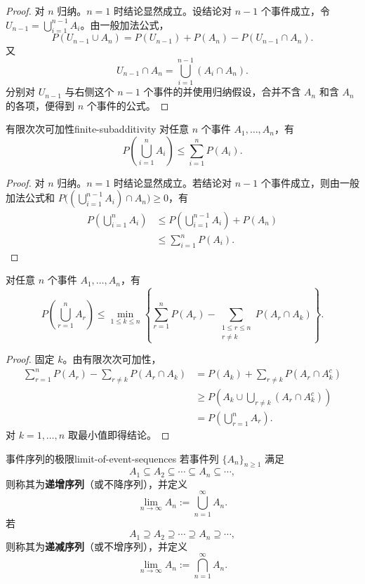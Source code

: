 \begin{proof}
对 $n$ 归纳。$n=1$ 时结论显然成立。设结论对 $n-1$ 个事件成立，令 $U_{n-1}=\bigcup_{i=1}^{n-1}A_i$。由一般加法公式，
\[
P(U_{n-1}\cup A_n)=P(U_{n-1})+P(A_n)-P(U_{n-1}\cap A_n).
\]
又
\[
U_{n-1}\cap A_n=\bigcup_{i=1}^{n-1}(A_i\cap A_n).
\]
分别对 $U_{n-1}$ 与右侧这个 $n-1$ 个事件的并使用归纳假设，合并不含 $A_n$ 和含 $A_n$ 的各项，便得到 $n$ 个事件的公式。
\end{proof}

\begin{mycorollary}{有限次次可加性}{finite-subadditivity}
对任意 $n$ 个事件 $A_1,\ldots,A_n$，有
\[
P\left(\bigcup_{i=1}^{n}A_i\right)
\leq\sum_{i=1}^{n}P(A_i).
\]
\end{mycorollary}

\begin{proof}
对 $n$ 归纳。$n=1$ 时结论显然成立。若结论对 $n-1$ 个事件成立，则由一般加法公式和 $P\bigl((\bigcup_{i=1}^{n-1}A_i)\cap A_n\bigr)\geq0$，有
\[
\begin{aligned}
P\left(\bigcup_{i=1}^{n}A_i\right)
&\leq P\left(\bigcup_{i=1}^{n-1}A_i\right)+P(A_n)\\
&\leq\sum_{i=1}^{n}P(A_i).
\end{aligned}
\]
\end{proof}

\begin{example}
对任意 $n$ 个事件 $A_1,\ldots,A_n$，有
\[
P\left(\bigcup_{r=1}^{n}A_r\right)
\leq\min_{1\leq k\leq n}
\left\{
\sum_{r=1}^{n}P(A_r)-\sum_{\substack{1\leq r\leq n\\ r\ne k}}P(A_r\cap A_k)
\right\}.
\]
\end{example}

\begin{proof}
固定 $k$。由有限次次可加性，
\[
\begin{aligned}
\sum_{r=1}^{n}P(A_r)-\sum_{r\ne k}P(A_r\cap A_k)
&=P(A_k)+\sum_{r\ne k}P(A_r\cap A_k^c)\\
&\geq P\left(A_k\cup\bigcup_{r\ne k}(A_r\cap A_k^c)\right)\\
&=P\left(\bigcup_{r=1}^{n}A_r\right).
\end{aligned}
\]
对 $k=1,\ldots,n$ 取最小值即得结论。
\end{proof}

\begin{mydefinition}{事件序列的极限}{limit-of-event-sequences}
若事件列 $\{A_n\}_{n\geq1}$ 满足
\[
A_1\subseteq A_2\subseteq\cdots\subseteq A_n\subseteq\cdots,
\]
则称其为\textbf{递增序列}（或不降序列），并定义
\[
\lim_{n\to\infty}A_n:=\bigcup_{n=1}^{\infty}A_n.
\]
若
\[
A_1\supseteq A_2\supseteq\cdots\supseteq A_n\supseteq\cdots,
\]
则称其为\textbf{递减序列}（或不增序列），并定义
\[
\lim_{n\to\infty}A_n:=\bigcap_{n=1}^{\infty}A_n.
\]
\end{mydefinition}

